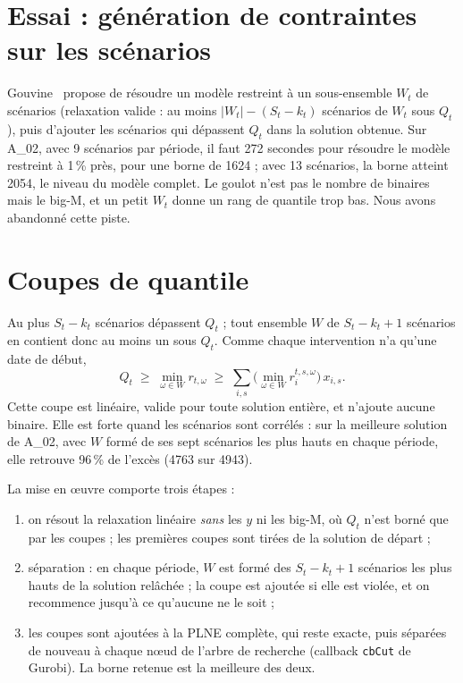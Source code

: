 \documentclass[11pt,a4paper]{report}
\begin{document}
\section{Essai : génération de contraintes sur les scénarios}

Gouvine~\cite{gouvine} propose de résoudre un modèle restreint à un sous-ensemble $W_t$ de scénarios
(relaxation valide : au moins $|W_t| - (S_t - k_t)$ scénarios de $W_t$ sous $Q_t$), puis d'ajouter les
scénarios qui dépassent $Q_t$ dans la solution obtenue. Sur A\_02, avec 9 scénarios par période, il
faut 272 secondes pour résoudre le modèle restreint à 1\,\% près, pour une borne de 1624 ; avec 13
scénarios, la borne atteint 2054, le niveau du modèle complet. Le goulot n'est pas le nombre de
binaires mais le big-M, et un petit $W_t$ donne un rang de quantile trop bas. Nous avons abandonné
cette piste.

\section{Coupes de quantile}

Au plus $S_t - k_t$ scénarios dépassent $Q_t$ ; tout ensemble $W$ de $S_t - k_t + 1$ scénarios en
contient donc au moins un sous $Q_t$. Comme chaque intervention n'a qu'une date de début,
\[
  Q_t \;\ge\; \min_{\omega \in W} r_{t,\omega}
      \;\ge\; \sum_{i,s} \Big( \min_{\omega \in W} r_i^{t,s,\omega} \Big) \, x_{i,s}.
\]
Cette coupe est linéaire, valide pour toute solution entière, et n'ajoute aucune binaire. Elle est
forte quand les scénarios sont corrélés : sur la meilleure solution de A\_02, avec $W$ formé de ses
sept scénarios les plus hauts en chaque période, elle retrouve 96\,\% de l'excès (4763 sur 4943).

La mise en œuvre comporte trois étapes :
\begin{enumerate}
  \item on résout la relaxation linéaire \emph{sans} les $y$ ni les big-M, où $Q_t$ n'est borné que par
        les coupes ; les premières coupes sont tirées de la solution de départ ;
  \item séparation : en chaque période, $W$ est formé des $S_t - k_t + 1$ scénarios les plus hauts de
        la solution relâchée ; la coupe est ajoutée si elle est violée, et on recommence jusqu'à ce
        qu'aucune ne le soit ;
  \item les coupes sont ajoutées à la PLNE complète, qui reste exacte, puis séparées de nouveau à
        chaque nœud de l'arbre de recherche (callback \texttt{cbCut} de Gurobi). La borne retenue est
        la meilleure des deux.
\end{enumerate}
\end{document}
